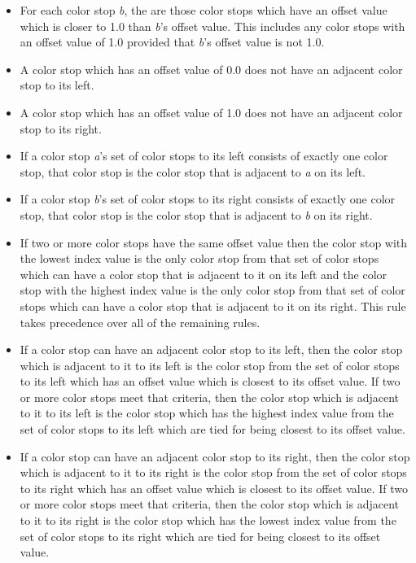 \begin{itemize}
\item For each color stop \textit{b}, the  are those color stops which have an offset value which is closer to 1.0 than \textit{b}'s offset value.
\enternote
This includes any color stops with an offset value of 1.0 provided that \textit{b}'s offset value is not 1.0.
\exitnote

\item A color stop which has an offset value of 0.0 does not have an adjacent color stop to its left.

\item A color stop which has an offset value of 1.0 does not have an adjacent color stop to its right.

\item If a color stop \textit{a}'s set of color stops to its left consists of exactly one color stop, that color stop is the color stop that is adjacent to \textit{a} on its left.

\item If a color stop \textit{b}'s set of color stops to its right consists of exactly one color stop, that color stop is the color stop that is adjacent to \textit{b} on its right.

\item If two or more color stops have the same offset value then the color stop with the lowest index value is the only color stop from that set of color stops which can have a color stop that is adjacent to it on its left and the color stop with the highest index value is the only color stop from that set of color stops which can have a color stop that is adjacent to it on its right. This rule takes precedence over all of the remaining rules.

\item If a color stop can have an adjacent color stop to its left, then the color stop which is adjacent to it to its left is the color stop from the set of color stops to its left which has an offset value which is closest to its offset value. If two or more color stops meet that criteria, then the color stop which is adjacent to it to its left is the color stop which has the highest index value from the set of color stops to its left which are tied for being closest to its offset value.

\item If a color stop can have an adjacent color stop to its right, then the color stop which is adjacent to it to its right is the color stop from the set of color stops to its right which has an offset value which is closest to its offset value. If two or more color stops meet that criteria, then the color stop which is adjacent to it to its right is the color stop which has the lowest index value from the set of color stops to its right which are tied for being closest to its offset value.


\end{itemize}
